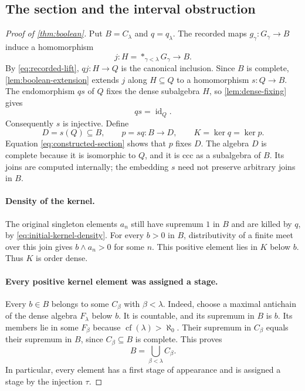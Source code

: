 \documentclass[11pt]{article}
\theoremstyle{definition}
\theoremstyle{remark}
\newcommand{\id}{\operatorname{id}}
\begin{document}
\subsection{The section and the interval obstruction}\label{sec:retraction}

\begin{proof}[Proof of \cref{thm:boolean}]
Put $B=C_\lambda$ and $q=q_\lambda$. The recorded maps
$g_\gamma:G_\gamma\to B$ induce a homomorphism
\[
 j:H=*_{\gamma<\lambda}G_\gamma\longrightarrow B.
\]
By \eqref{eq:recorded-lift}, $qj:H\to Q$ is the canonical inclusion.
Since $B$ is complete, \cref{lem:boolean-extension} extends $j$ along
$H\subseteq Q$ to a homomorphism $s:Q\to B$. The endomorphism $qs$
of $Q$ fixes the dense subalgebra $H$, so \cref{lem:dense-fixing} gives
\begin{equation}\label{eq:constructed-section}
 qs=\id_Q.
\end{equation}
Consequently $s$ is injective. Define
\begin{equation}\label{eq:constructed-retraction}
 D=s(Q)\subseteq B,
 \qquad p=sq:B\longrightarrow D,
 \qquad K=\ker q=\ker p.
\end{equation}
Equation \eqref{eq:constructed-section} shows that $p$ fixes $D$.
The algebra $D$ is complete because it is isomorphic to $Q$, and it
is ccc as a subalgebra of $B$. Its joins are computed internally;
the embedding $s$ need not preserve arbitrary joins in $B$.

\paragraph{Density of the kernel.}
The original singleton elements $a_n$ still have supremum $1$ in
$B$ and are killed by $q$, by \eqref{eq:initial-kernel-density}.
For every $b>0$ in $B$, distributivity of a finite meet over this
join gives $b\wedge a_n>0$ for some $n$. This positive element lies
in $K$ below $b$. Thus $K$ is order dense.

\paragraph{Every positive kernel element was assigned a stage.}
Every $b\in B$ belongs to some $C_\beta$ with $\beta<\lambda$.
Indeed, choose a maximal antichain of the dense algebra $F_\lambda$
below $b$. It is countable, and its supremum in $B$ is $b$.
Its members lie in some $F_\beta$ because
$\operatorname{cf}(\lambda)>\aleph_0$. Their supremum in $C_\beta$
equals their supremum in $B$, since $C_\beta\subseteq B$ is complete.
This proves
\begin{equation}\label{eq:bounded-source}
 B=\bigcup_{\beta<\lambda}C_\beta.
\end{equation}
In particular, every element has a first stage of appearance and is
assigned a stage by the injection $\tau$.


\end{proof}
\end{document}
